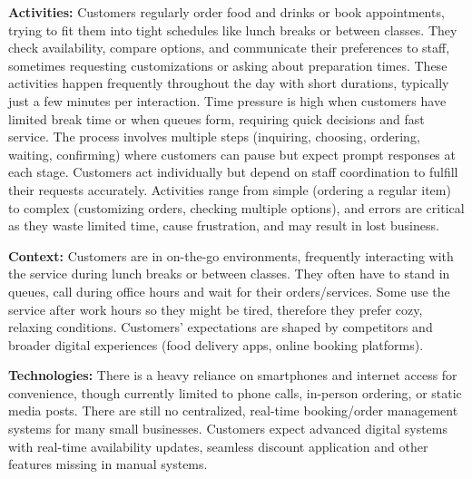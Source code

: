 \documentclass[]{VUMIFTemplateClass}
\begin{document}
    \textbf{Activities:} Customers regularly order food and drinks or book
    appointments, trying to fit them into tight schedules like lunch breaks or
    between classes. They check availability, compare options, and communicate their
    preferences to staff, sometimes requesting customizations or asking about
    preparation times. These activities happen frequently throughout the day with
    short durations, typically just a few minutes per interaction. Time pressure is
    high when customers have limited break time or when queues form, requiring quick
    decisions and fast service. The process involves multiple steps (inquiring,
    choosing, ordering, waiting, confirming) where customers can pause but expect
    prompt responses at each stage. Customers act individually but depend on staff
    coordination to fulfill their requests accurately. Activities range from simple
    (ordering a regular item) to complex (customizing orders, checking multiple
    options), and errors are critical as they waste limited time, cause frustration,
    and may result in lost business.

\textbf{Context:} Customers are in on-the-go environments, frequently interacting with the service during lunch breaks or between classes. They often have to stand in queues, call during office hours and wait for their orders/services. Some use the service after work hours so they might be tired, therefore they prefer cozy, relaxing conditions. Customers' expectations are shaped by competitors and broader digital experiences (food delivery apps, online booking platforms).

\textbf{Technologies:} There is a heavy reliance on smartphones and internet
access for convenience, though currently limited to phone calls, in-person
ordering, or static media posts. There are still no centralized, real-time
booking/order management systems for many small businesses. Customers expect
advanced digital systems with real-time availability updates, seamless discount
application and other features missing in manual systems.
\end{document}
